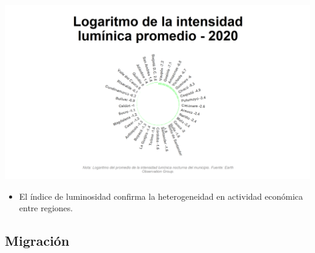 \documentclass[aspectratio=169]{beamer}
\begin{document}
    
    \begin{slide}{8} 
            \begin{imagecolumn}
                \includegraphics[width=\columnwidth]{img/var_301_static.png}
            \end{imagecolumn}
            \begin{textcolumn}
                \begin{itemize}
                    \item El índice de luminosidad confirma la heterogeneidad en actividad económica entre regiones.
                \end{itemize}
            \end{textcolumn}

    \printcolumns
    \end{slide}
    
    
    \subsection{Migración}
    
\end{document}
